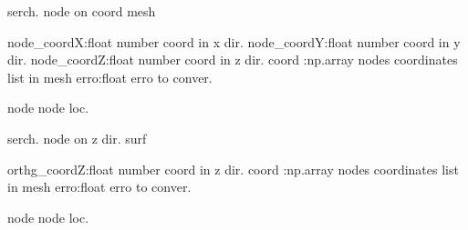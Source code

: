 \documentclass[letterpaper,10pt,english]{sphinxmanual}
\begin{document}

\begin{fulllineitems}
\label{\detokenize{myfempy.felib.physics:myfempy.felib.physics.getnode.search_nodexyz}}
\pysigstartsignatures
{}
\pysigstopsignatures
\sphinxAtStartPar
serch. node on coord mesh
\begin{description}
\sphinxAtStartPar
node\_coordX:float  \textendash{} number coord in x dir.
node\_coordY:float  \textendash{} number coord in y dir.
node\_coordZ:float  \textendash{} number coord in z dir.
coord :np.array     \textendash{} nodes coordinates list in mesh
erro:float          \textendash{} erro to conver.

\sphinxAtStartPar
node                \textendash{} node loc.

\end{description}

\end{fulllineitems}


\begin{fulllineitems}
\label{\detokenize{myfempy.felib.physics:myfempy.felib.physics.getnode.search_surfxy}}
\pysigstartsignatures
{}
\pysigstopsignatures
\sphinxAtStartPar
serch. node on z dir. surf
\begin{description}
\sphinxAtStartPar
orthg\_coordZ:float  \textendash{} number coord in z dir.
coord :np.array     \textendash{} nodes coordinates list in mesh
erro:float          \textendash{} erro to conver.

\sphinxAtStartPar
node                \textendash{} node loc.

\end{description}

\end{fulllineitems}
\end{document}
